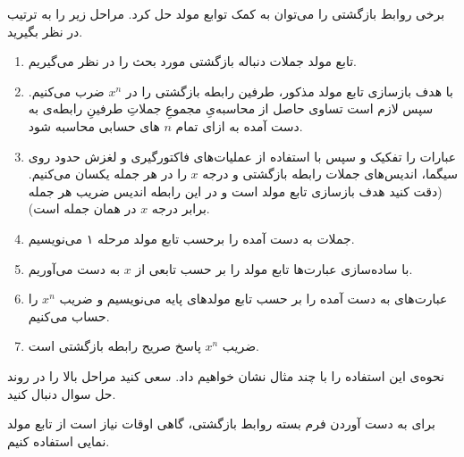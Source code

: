 \p
برخی روابط بازگشتی را می‌توان به کمک توابع مولد حل کرد.
مراحل زیر را به ترتیب در نظر بگیرید.
\begin{enumerate}[label=\arabic*)]
    \item تابع مولد جملات دنباله بازگشتی مورد بحث را در نظر می‌گیریم.
    \item با هدف بازسازی تابع مولد مذکور،
     طرفین رابطه بازگشتی را در
    $x^n$
     ضرب می‌کنیم. سپس لازم است تساوی حاصل از محاسبه‌یِ مجموعِ جملاتِ طرفینِ رابطه‌ی به دست آمده به ازای تمام 
     $n$
     های حسابی محاسبه شود.
    \item عبارات را تفکیک و سپس با استفاده از عملیات‌های فاکتورگیری و لغزش حدود روی سیگما، اندیس‌های جملات رابطه بازگشتی و درجه $x$ را در هر جمله یکسان می‌کنیم.
    (دقت کنید هدف بازسازی تابع مولد است و در این رابطه اندیس‌ ضریب هر جمله برابر درجه $x$ در همان جمله است).
    \item جملات به دست آمده را برحسب تابع مولد مرحله ۱ می‌نویسیم.
    \item با ساده‌سازی عبارت‌ها تابع مولد را بر حسب تابعی از $x$ به دست می‌آوریم.
    \item عبارت‌های به دست آمده را بر حسب تابع مولد‌های پایه می‌نویسیم و ضریب $x^n$ را حساب می‌کنیم.
    \item ضریب $x^n$ پاسخ صریح رابطه بازگشتی است.
\end{enumerate}
\p
نحوه‌ی این استفاده را با چند مثال نشان خواهیم داد.
سعی کنید مراحل بالا را در روند حل سوال دنبال کنید.




\p
برای به دست آوردن فرم بسته روابط بازگشتی، گاهی اوقات نیاز است از تابع مولد نمایی استفاده کنیم.

